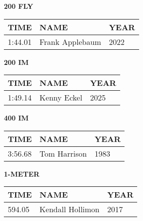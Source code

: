 \begin{table}[H]
\centering
\begin{minipage}[t]{0.48\textwidth}
\centering
\textbf{200 FLY}\\[0.1cm]
\begin{tabular}{@{}p{1.8cm}p{2.8cm}p{1.2cm}@{}}
\hline
    \textbf{TIME} & \textbf{NAME} & \textbf{YEAR} \\
\hline
    1:44.01 & Frank Applebaum & 2022 \\
\hline
\end{tabular}
\end{minipage}\hfill
\begin{minipage}[t]{0.48\textwidth}
\centering
\textbf{200 IM}\\[0.1cm]
\begin{tabular}{@{}p{1.8cm}p{2.8cm}p{1.2cm}@{}}
\hline
    \textbf{TIME} & \textbf{NAME} & \textbf{YEAR} \\
\hline
    1:49.14 & Kenny Eckel & 2025 \\
\hline
\end{tabular}
\end{minipage}
\end{table}

\begin{table}[H]
\centering
\begin{minipage}[t]{0.6\textwidth}
\centering
\textbf{400 IM}\\[0.1cm]
\begin{tabular}{@{}p{1.8cm}p{2.8cm}p{1.2cm}@{}}
\hline
    \textbf{TIME} & \textbf{NAME} & \textbf{YEAR} \\
\hline
    3:56.68 & Tom Harrison & 1983 \\
\hline
\end{tabular}
\end{minipage}
\end{table}

\begin{table}[H]
\centering
\begin{minipage}[t]{0.6\textwidth}
\centering
\textbf{1-METER}\\[0.1cm]
\begin{tabular}{@{}p{1.8cm}p{2.8cm}p{1.2cm}@{}}
\hline
    \textbf{TIME} & \textbf{NAME} & \textbf{YEAR} \\
\hline
    594.05 & Kendall Hollimon & 2017 \\
\hline
\end{tabular}
\end{minipage}
\end{table}

